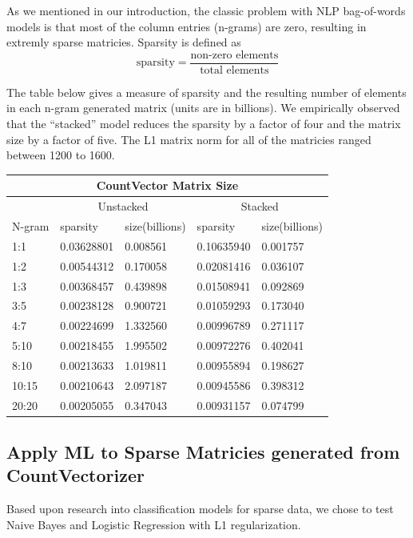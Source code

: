 \documentclass[11pt]{article}
\newcommand{\vertSpace}[1]{\vspace{3mm}}
\begin{document}
{As we mentioned in our introduction, the classic problem with NLP bag-of-words models is that most of the column entries (n-grams) are zero, resulting in extremly sparse matricies.  
Sparsity is defined as
\begin{equation*}
\mbox{sparsity} = \frac{\mbox{non-zero elements}}{\mbox{total elements}}
\end{equation*}

The table below gives a measure of sparsity  and the resulting number of elements in each n-gram generated matrix (units are in billions).  We empirically observed that the ``stacked'' model reduces the sparsity by a factor of four and the matrix size by a factor of five. The L1 matrix norm for all of the matricies ranged between 1200 to 1600.\\

\noindent \begin{tabular}{ |p{2cm}||p{2cm}|p{2cm}|p{2cm}|p{2cm}|  }
 \hline
 \multicolumn{5}{|c|}{CountVector Matrix Size} \\
 \hline
 \multicolumn{1}{|c|}{} &
 \multicolumn{2}{|c|}{Unstacked} &
 \multicolumn{2}{|c|}{Stacked}\\
 \hline
 N-gram & sparsity & size(billions) & sparsity & size(billions)\\
 \hline
       1:1& 0.03628801& 0.008561&  0.10635940&   0.001757 \\
       1:2& 0.00544312& 0.170058&  0.02081416&    0.036107\\
       1:3& 0.00368457& 0.439898&  0.01508941&     0.092869\\
       3:5& 0.00238128& 0.900721&  0.01059293&     0.173040\\
       4:7& 0.00224699& 1.332560&  0.00996789&     0.271117\\
      5:10& 0.00218455& 1.995502&  0.00972276&     0.402041\\
      8:10& 0.00213633& 1.019811&  0.00955894&     0.198627\\
     10:15& 0.00210643& 2.097187&  0.00945586&     0.398312\\
     20:20& 0.00205055& 0.347043&  0.00931157&     0.074799\\
 \hline
\end{tabular}





\subsection{Apply ML to Sparse Matricies generated from CountVectorizer}
\noindent
Based upon research into classification models for sparse data, we chose to test Naive Bayes and Logistic Regression with L1 regularization.  \vertSpace

}
\end{document}
